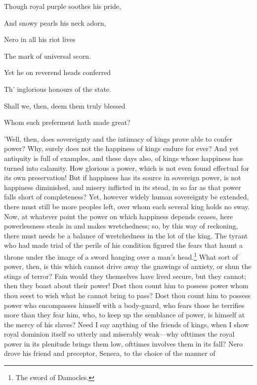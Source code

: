 
Though royal purple soothes his pride,

And snowy pearls his neck adorn,

Nero in all his riot lives

The mark of universal scorn.

Yet he on reverend heads conferred

Th' inglorious honours of the state.

Shall we, then, deem them truly blessed

Whom such preferment hath made great?


'Well, then, does sovereignty and the intimacy of kings prove able to
confer power? Why, surely does not the happiness of kings endure for
ever? And yet antiquity is full of examples, and these days also, of
kings whose happiness has turned into calamity. How glorious a power,
which is not even found effectual for its own preservation! But if
happiness has its source in sovereign power, is not happiness
diminished, and misery inflicted in its stead, in so far as that power
falls short of completeness? Yet, however widely human sovereignty be
extended, there must still be more peoples left, over whom each several
king holds no sway. Now, at whatever point the power on which happiness
depends ceases, here powerlessness steals in and makes wretchedness; so,
by this way of reckoning, there must needs be a balance of wretchedness
in the lot of the king. The tyrant who had made trial of the perils of
his condition figured the fears that haunt a throne under the image of a
sword hanging over a man's head.\footnote{The sword of Damocles.} What sort of power, then, is this
which cannot drive away the gnawings of anxiety, or shun the stings of
terror? Fain would they themselves have lived secure, but they cannot;
then they boast about their power! Dost thou count him to possess power
whom thou seest to wish what he cannot bring to pass? Dost thou count
him to possess power who encompasses himself with a body-guard, who
fears those he terrifies more than they fear him, who, to keep up the
semblance of power, is himself at the mercy of his slaves? Need I say
anything of the friends of kings, when I show royal dominion itself so
utterly and miserably weak—why ofttimes the royal power in its
plenitude brings them low, ofttimes involves them in its fall? Nero
drove his friend and preceptor, Seneca, to the choice of the manner of
